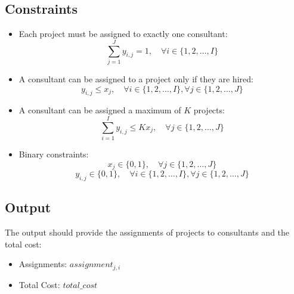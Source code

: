 \documentclass{article}
\begin{document}
\subsection*{Constraints}
\begin{itemize}
    \item Each project must be assigned to exactly one consultant:
    \[
    \sum_{j=1}^{J} y_{i,j} = 1, \quad \forall i \in \{1, 2, \ldots, I\}
    \]
    
    \item A consultant can be assigned to a project only if they are hired:
    \[
    y_{i,j} \leq x_j, \quad \forall i \in \{1, 2, \ldots, I\}, \forall j \in \{1, 2, \ldots, J\}
    \]
    
    \item A consultant can be assigned a maximum of \(K\) projects:
    \[
    \sum_{i=1}^{I} y_{i,j} \leq K x_j, \quad \forall j \in \{1, 2, \ldots, J\}
    \]
    
    \item Binary constraints:
    \[
    x_j \in \{0, 1\}, \quad \forall j \in \{1, 2, \ldots, J\}
    \]
    \[
    y_{i,j} \in \{0, 1\}, \quad \forall i \in \{1, 2, \ldots, I\}, \forall j \in \{1, 2, \ldots, J\}
    \]
\end{itemize}

\subsection*{Output}
The output should provide the assignments of projects to consultants and the total cost:
\begin{itemize}
    \item Assignments: \(assignment_{j,i}\)
    \item Total Cost: \(total\_cost\)
\end{itemize}
\end{document}
